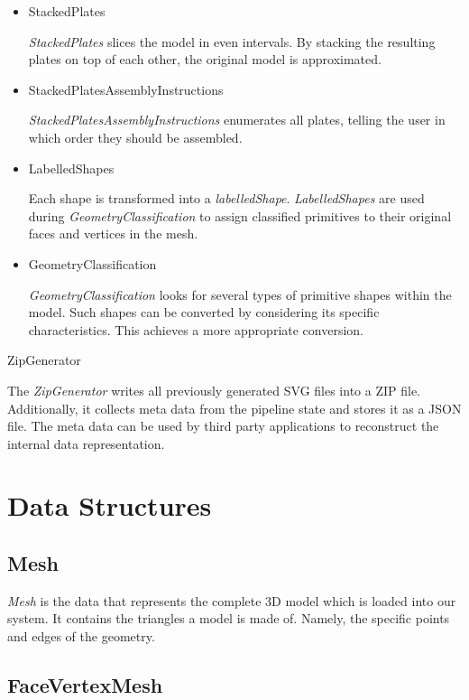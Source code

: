 \documentclass[../ClassicThesis.tex]{subfiles}
\begin{document}
\begin{itemize}
\item StackedPlates

\emph{StackedPlates} slices the model in even intervals. By stacking the resulting plates on top of each other, the original model is approximated.


\item StackedPlatesAssemblyInstructions

\emph{StackedPlatesAssemblyInstructions} enumerates all plates, telling the user in which order they should be assembled.


\item LabelledShapes

Each shape is transformed into a \emph{labelledShape}. \emph{LabelledShapes} are used during \emph{GeometryClassification} to assign classified primitives to their original faces and vertices in the mesh.


\item GeometryClassification

\emph{GeometryClassification} looks for several types of primitive shapes within the model. Such shapes can be converted by considering its specific characteristics. This achieves a more appropriate conversion.
\end{itemize}


\item ZipGenerator

The \emph{ZipGenerator} writes all previously generated SVG files into a ZIP file. Additionally, it collects meta data from the pipeline state and stores it as a JSON file. The meta data can be used by third party applications to reconstruct the internal data representation.





\section{Data Structures}\label{sec:datastructures}

\subsection*{Mesh}

\emph{Mesh} is the data that represents the complete 3D model which is loaded into our system. It contains the triangles a model is made of. Namely, the specific points and edges of the geometry.

\subsection*{FaceVertexMesh}
\end{document}
